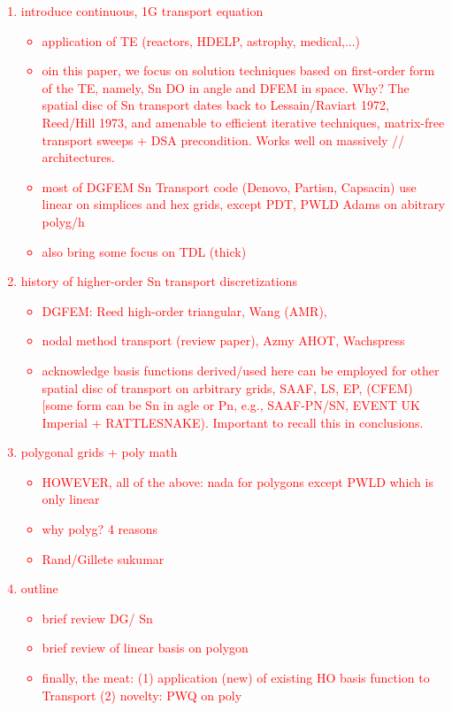 \documentclass[preprint,10pt]{elsarticle}
\newcommand{\tcr}[1]{\textcolor{red}{#1}}
\begin{document}
\tcr
{
\begin{enumerate}
\item introduce continuous, 1G transport equation
\begin{itemize}
\item application of TE (reactors, HDELP, astrophy, medical,...)
\item oin this paper, we focus on solution techniques based on first-order form of the TE, namely, Sn DO in angle and DFEM in space. Why? The spatial disc of Sn transport dates back to Lessain/Raviart 1972, Reed/Hill 1973, and amenable to efficient iterative techniques, matrix-free transport sweeps + DSA precondition. Works well on massively // architectures.  
\item most of DGFEM Sn Transport code (Denovo, Partisn, Capsacin) use linear on simplices and hex grids, except PDT, PWLD Adams on abitrary polyg/h
\item also bring some focus on TDL (thick)
\end{itemize}
\item history of higher-order Sn transport discretizations
\begin{itemize}
\item DGFEM: Reed high-order triangular, Wang (AMR), 
\item nodal method transport (review paper), Azmy AHOT, Wachspress 
\item acknowledge basis functions derived/used here can be employed for other spatial disc of transport on arbitrary grids, SAAF, LS, EP, (CFEM) [some form can be Sn in agle or Pn, e.g., SAAF-PN/SN, EVENT UK Imperial  + RATTLESNAKE). Important to recall this in conclusions. 
\end{itemize}
\item polygonal grids + poly math
\begin{itemize}
\item HOWEVER, all of the above: nada for polygons except PWLD which is only linear
\item why polyg? 4 reasons 
\item Rand/Gillete sukumar
\end{itemize}
\item outline
\begin{itemize}
\item brief review DG/ Sn
\item brief review of linear basis on polygon
\item finally, the meat: (1) application (new) of existing HO basis function to Transport (2) novelty: PWQ on poly
\end{itemize}
\end{enumerate}
}
\end{document}
